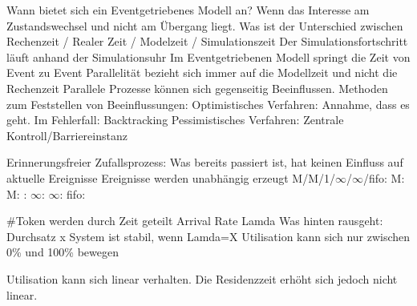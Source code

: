\documentclass[ngerman,a4paper,12pt]{scrreprt}
\begin{document}
\ul
	\li Wann bietet sich ein Eventgetriebenes Modell an? 
		\ul 
			\li Wenn das Interesse am Zustandswechsel und nicht am Übergang liegt. 
		\ulE
	\li Was ist der Unterschied zwischen Rechenzeit / Realer Zeit / Modelzeit / Simulationszeit
		\ul 
			\li Der Simulationsfortschritt läuft anhand der Simulationsuhr
			\li Im Eventgetriebenen Modell springt die Zeit von Event zu Event
			\li Parallelität bezieht sich immer auf die Modellzeit und nicht die Rechenzeit
		\ulE
	\li Parallele Prozesse können sich gegenseitig Beeinflussen. Methoden zum Feststellen von Beeinflussungen:
		\ul
			\li Optimistisches Verfahren: Annahme, dass es geht. Im Fehlerfall: Backtracking
			\li Pessimistisches Verfahren: Zentrale Kontroll/Barriereinstanz
		\ulE
\ulE



\ul
	\li Erinnerungsfreier Zufallsprozess: Was bereits passiert ist, hat keinen Einfluss auf aktuelle Ereignisse \ra Ereignisse werden unabhängig erzeugt
	\li M/M/1/$\infty$/$\infty$/fifo:
		\ul
			\li M:
			\li M:
			:
			\li $\infty$:
			\li $\infty$:
			\li fifo: 
		\ulE
\ulE

\ul
	\li \#Token werden durch Zeit geteilt \ra Arrival Rate Lamda
	\li Was hinten rausgeht: Durchsatz x
	\li System ist stabil, wenn Lamda=X
	\li Utilisation kann sich nur zwischen 0\% und 100\% bewegen
\ulE
{}

\ul
	\li Utilisation kann sich linear verhalten. 
	\li Die Residenzzeit erhöht sich jedoch nicht linear.
\ulE
{}



\end{document}

